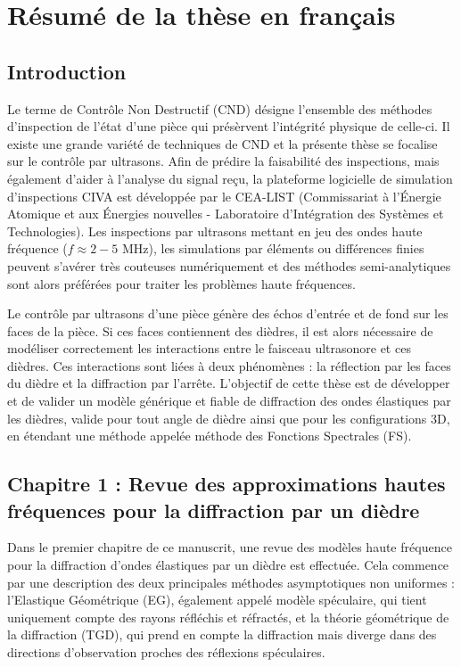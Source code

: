 \chapter[][Résumé de la thèse en français]{Résumé de la thèse en français}

\section[Introduction]{Introduction}

Le terme de Contrôle Non Destructif (CND) désigne l'ensemble des méthodes d'inspection de l'état d'une pièce qui présèrvent l'intégrité physique de celle-ci. Il existe une grande variété de techniques de CND et la présente thèse se focalise sur le contrôle par ultrasons. Afin de prédire la faisabilité des inspections, mais également d'aider à l'analyse du signal reçu, la plateforme logicielle de simulation d'inspections CIVA est développée par le CEA-LIST (Commissariat à l’Énergie Atomique et aux Énergies nouvelles - Laboratoire d’Intégration des Systèmes et Technologies). Les inspections par ultrasons mettant en jeu des ondes haute fréquence ($f\approx2-5$ MHz), les simulations par éléments ou différences finies peuvent s'avérer très couteuses numériquement et des méthodes semi-analytiques sont alors préférées pour traiter les problèmes haute fréquences.

Le contrôle par ultrasons d'une pièce génère des échos d'entrée et de fond sur les faces de la pièce. Si ces faces contiennent des dièdres, il est alors nécessaire de modéliser correctement les interactions entre le faisceau ultrasonore et ces dièdres. Ces interactions sont liées à deux phénomènes : la réflection par les faces du dièdre et la diffraction par l'arrête. L'objectif de cette thèse est de développer et de valider un modèle générique et fiable de diffraction des ondes élastiques par les dièdres, valide pour tout angle de dièdre ainsi que pour les configurations 3D, en étendant une méthode appelée méthode des Fonctions Spectrales (FS).


\section[Résumé du chapitre 1]{Chapitre 1 : Revue des approximations hautes fréquences pour la diffraction par un dièdre}

Dans le premier chapitre de ce manuscrit, une revue des modèles haute fréquence pour la diffraction d'ondes élastiques par un dièdre est effectuée. Cela commence par une description des deux principales méthodes asymptotiques non uniformes : l'Elastique Géométrique (EG), également appelé modèle spéculaire, qui tient uniquement compte des rayons réfléchis et réfractés, et la théorie géométrique de la diffraction (TGD), qui prend en compte la diffraction mais diverge dans des directions d'observation proches des réflexions spéculaires. 

